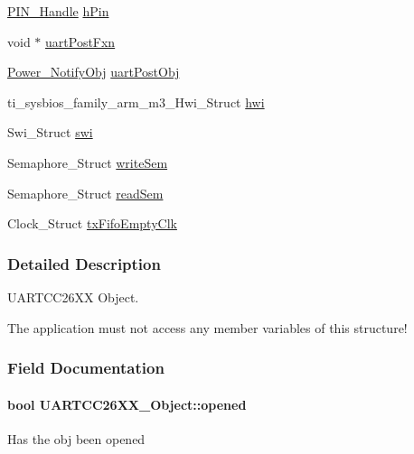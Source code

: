 \begin{DoxyCompactItemize}
\item 
\hyperlink{_p_i_n_8h_afb2de52b054638f63c39df1f30a0d88d}{P\+I\+N\+\_\+\+Handle} \hyperlink{struct_u_a_r_t_c_c26_x_x___object_acf3b45b67310e399f3fcf6ad449fa445}{h\+Pin}
\item 
void $\ast$ \hyperlink{struct_u_a_r_t_c_c26_x_x___object_a990a1d69fb8edf1e88f47e01f7de4e5f}{uart\+Post\+Fxn}
\item 
\hyperlink{struct_power___notify_obj}{Power\+\_\+\+Notify\+Obj} \hyperlink{struct_u_a_r_t_c_c26_x_x___object_a06f854831de50d17f7249224f560cdd5}{uart\+Post\+Obj}
\item 
ti\+\_\+sysbios\+\_\+family\+\_\+arm\+\_\+m3\+\_\+\+Hwi\+\_\+\+Struct \hyperlink{struct_u_a_r_t_c_c26_x_x___object_adfa38511dd1f8c470bb7f80afdfcd6eb}{hwi}
\item 
Swi\+\_\+\+Struct \hyperlink{struct_u_a_r_t_c_c26_x_x___object_a2697a8c771718dfa23ddca3f45e124f4}{swi}
\item 
Semaphore\+\_\+\+Struct \hyperlink{struct_u_a_r_t_c_c26_x_x___object_a216c349e650909bd84072c076051117d}{write\+Sem}
\item 
Semaphore\+\_\+\+Struct \hyperlink{struct_u_a_r_t_c_c26_x_x___object_ab81ce13969ecc77d764000ea53fb23d2}{read\+Sem}
\item 
Clock\+\_\+\+Struct \hyperlink{struct_u_a_r_t_c_c26_x_x___object_a97be7390556f78f9361505c4ee860469}{tx\+Fifo\+Empty\+Clk}
\end{DoxyCompactItemize}


\subsubsection{Detailed Description}
U\+A\+R\+T\+C\+C26\+X\+X Object. 

The application must not access any member variables of this structure! 

\subsubsection{Field Documentation}
\paragraph[{opened}]{\setlength{\rightskip}{0pt plus 5cm}bool U\+A\+R\+T\+C\+C26\+X\+X\+\_\+\+Object\+::opened}\label{struct_u_a_r_t_c_c26_x_x___object_aabff5933f6661e2ebdbd8b001a6c12d7}
Has the obj been opened 
